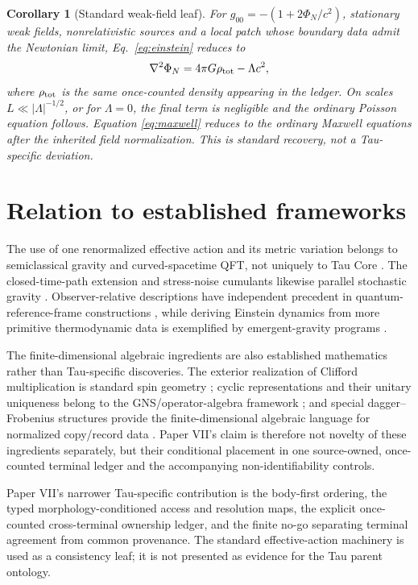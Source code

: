 \documentclass[11pt]{article}
\newtheorem{corollary}{Corollary}
\begin{document}
\begin{corollary}[Standard weak-field leaf]
For $g_{00}=-(1+2\Phi_N/c^2)$, stationary weak fields, nonrelativistic
sources and a local patch whose boundary data admit the Newtonian limit,
Eq.~\eqref{eq:einstein} reduces to
\begin{equation}
\nabla^2\Phi_N=4\pi G\rho_{\rm tot}-\Lambda c^2,
\end{equation}
where $\rho_{\rm tot}$ is the same once-counted density appearing in the
ledger.  On scales $L\ll |\Lambda|^{-1/2}$, or for $\Lambda=0$, the final term
is negligible and the ordinary Poisson equation follows. Equation
\eqref{eq:maxwell} reduces to the ordinary Maxwell equations after the
inherited field normalization. This is standard recovery, not a Tau-specific
deviation.
\end{corollary}

\section{Relation to established frameworks}

The use of one renormalized effective action and its metric variation belongs
to semiclassical gravity and curved-spacetime QFT, not uniquely to Tau Core
\citep{Wald1977,BirrellDavies1982,HollandsWald2001}.  The closed-time-path
extension and stress-noise cumulants likewise parallel stochastic gravity
\citep{HuVerdaguer2008}.  Observer-relative descriptions have independent
precedent in quantum-reference-frame constructions
\citep{GiacominiCastroRuizBrukner2019}, while deriving Einstein dynamics from
more primitive thermodynamic data is exemplified by emergent-gravity programs
\citep{Jacobson1995}.

The finite-dimensional algebraic ingredients are also established
mathematics rather than Tau-specific discoveries.  The exterior realization
of Clifford multiplication is standard spin geometry
\citep{LawsonMichelsohn1989}; cyclic representations and their unitary
uniqueness belong to the GNS/operator-algebra framework
\citep{BratteliRobinson1979}; and special dagger--Frobenius structures provide
the finite-dimensional algebraic language for normalized copy/record data
\citep{Vicary2011,CoeckePavlovicVicary2013}.  Paper VII's claim is therefore
not novelty of these ingredients separately, but their conditional placement
in one source-owned, once-counted terminal ledger and the accompanying
non-identifiability controls.

Paper VII's narrower Tau-specific contribution is the body-first ordering,
the typed morphology-conditioned access and resolution maps, the explicit
once-counted cross-terminal ownership ledger, and the finite no-go separating
terminal agreement from common provenance.  The standard effective-action
machinery is used as a consistency leaf; it is not presented as evidence for
the Tau parent ontology.
\end{document}
